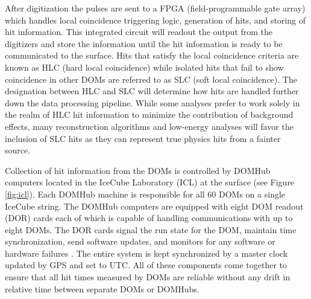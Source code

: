 \documentclass{gatech-thesis}
\begin{document}
After digitization the pulses are sent to a FPGA (field-programmable gate array) which handles local coincidence triggering logic, generation of hits, and storing of hit information. This integrated circuit will readout the output from the digitizers and store the information until the hit information is ready to be communicated to the surface. Hits that satisfy the local coincidence criteria are known as HLC (hard local coincidence) while isolated hits that fail to show coincidence in other DOMs are referred to as SLC (soft local coincidence). The designation between HLC and SLC will determine how hits are handled further down the data processing pipeline. While some analyses prefer to work solely in the realm of HLC hit information to minimize the contribution of background effects, many reconstruction algorithms and low-energy analyses will favor the inclusion of SLC hits as they can represent true physics hits from a fainter source.

Collection of hit information from the DOMs is controlled by DOMHub computers located in the IceCube Laboratory (ICL) at the surface (see Figure \ref{fig:icl}). Each DOMHub machine is responsible for all 60 DOMs on a single IceCube string. The DOMHub computers are equipped with eight DOM readout (DOR) cards each of which is capable of handling communications with up to eight DOMs. The DOR cards signal the run state for the DOM, maintain time synchronization, send software updates, and monitors for any software or hardware failures \cite{2009NIMPA.601..294A}. The entire system is kept synchronized by a master clock updated by GPS and set to UTC. All of these components come together to ensure that all hit times measured by DOMs are reliable without any drift in relative time between separate DOMs or DOMHubs.
\end{document}
